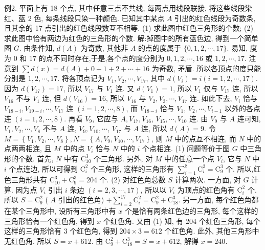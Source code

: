 例2. 平面上有 18 个点, 其中任意三点不共线, 每两点用线段联接, 将这些线段染红、蓝 2 色, 每条线段只染一种颜色.
已知其中某点 $A$ 引出的红色线段为奇数条,且其余的 17 点引出的红色线段数互不相等.
(1) 求此图中红色三角形的个数;
(2) 求此图中恰有两边为红色的三角形的个数.
解:掉图中的所有蓝色边, 得到一个简单图 $G$. 由条件知, $d(A)$ 为奇数, 其他非 $A$ 的点的度属于 $\{0,1,2, \cdots, 17\}$. 易知, 度为 0 和 17 的点不同时存在,于是,各个点的度分别为 $0,1,2, \cdots, 16$ 或 $1,2, \cdots, 17$.
注意到 $\sum d(x)=d(A)+0+1+2+\cdots+16$ 为奇数, 矛盾.
所以各顶点的度只能分别是 $1,2, \cdots, 17$. 将各顶点记为 $V_1, V_2, \cdots, V_{17}$, 其中 $d\left(V_i\right)=i (i=1,2, \cdots, 17)$.
因为 $d\left(V_{17}\right)=17$, 所以 $V_{17}$ 与 $V_1$ 连.
又 $d\left(V_1\right)=1$, 所以 $V_1$ 仅与 $V_{17}$ 连, 所以 $V_{16}$ 不与 $V_1$ 连, 但 $d\left(V_{16}\right)=16$, 所以 $V_{16}$ 与 $V_2, V_3, \cdots, V_{17}$ 连.
如此下去, $V_i$ 恰与 $V_{18-i}, V_{19-i}, \cdots, V_{17}$ 连 $(i=1,2, \cdots, 8)$, 而 $V_{18-i}$ 恰与 $V_1$, $V_2, \cdots, V_{i-1}$ 以外的各点连 $(i=1,2, \cdots, 8)$. 再看 $V_9$, 它应与 $A, V_{17}, V_{16}$, $V_{15}, \cdots, V_{10}$ 连.
由 $V_9$ 与 $A$ 连可知, $V_1, V_2, \cdots, V_8$ 不与 $A$ 连, $V_9, V_{10}, \cdots$, $V_{17}$ 与 $A$ 连, 所以 $d(A)=9$.
令 $M=\left\{V_1, V_2, \cdots, V_8\right\}, N=\left\{A, V_9, V_{10}, \cdots, V_{17}\right\}$, 则 $M$ 中的点互不相连, 而 $N$ 中的点两两相连, 且 $M$ 中的点 $V_i$ 恰与 $N$ 中的 $i$ 个点相连.
(1) 问题等价于图 $G$ 中三角形的个数.
首先, $N$ 中有 $\mathrm{C}_{10}^3$ 个三角形.
另外, 对 $M$ 中的任意一个点 $V_i$, 它与 $N$ 中 $i$ 个点连边, 所以可得到 $\mathrm{C}_i^2$ 个三角形, 这样的三角形有 $\sum_{i=1}^8 \mathrm{C}_i^2=\mathrm{C}_9^3$ 个.
所以,红色三角形共有 $\mathrm{C}_{10}^3+\mathrm{C}_9^3=204$ 个.
(2) 对红色角总数 $S$ 计算两次.
一方面, 对 $G$ 计算.
因为点 $V_i$ 引出 $i$ 条边 $(i=2,3, \cdots, 17)$, 所以以 $V_i$ 为顶点的红色角有 $\mathrm{C}_i^2$ 个.
所以 $S=\mathrm{C}_9^2$ ( $A$ 引出的红色角) $+\sum_{i=2}^{17} \mathrm{C}_i^2=\mathrm{C}_9^2+\mathrm{C}_{18}^3$.
另一方面, 每个红色角都在某个三角形中, 设所有三角形中有 $x$ 个是恰有两条红色边的三角形, 每个这样的三角形恰有一个红色角, 得到 $x$ 个红色角.
又由 (1) 知, 有 204 个红色三角形, 每个这样的三角形恰有 3 个红色角, 得到 $204 \times 3=612$ 个红色角.
此外, 其他三角形中无红色角.
所以 $S=x+612$.
由 $\mathrm{C}_9^2+\mathrm{C}_{18}^3=S=x+612$, 解得 $x=240$.



